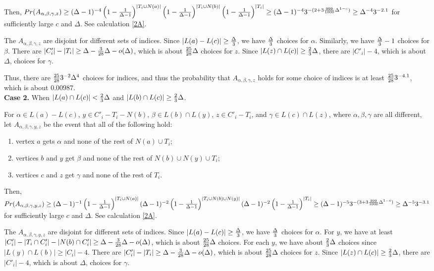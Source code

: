 \documentclass[12pt]{article}
\theoremstyle{definition}
\begin{document}
Then, $Pr(A_{\alpha, \beta, \gamma, z})\geq (\Delta-1)^{-4}\left(1-{1\over \Delta-1}\right)^{|T_i\cup N(a)|}\left(1-{1\over \Delta-1}\right)^{|T_i\cup N(b)|}\left(1-{1\over \Delta-1}\right)^{|T_i|}\geq (\Delta-1)^{-4}3^{-(2+3{999\over 1 000}\Delta^{1-c})}\geq \Delta^{-4} 3^{-2.1}$ for sufficiently large $c$ and $\Delta$. See calculation \ref{2A}.

The $A_{\alpha, \beta, \gamma, z}$ are disjoint for different sets of indices. 
Since $|L(a)-L(c)|\geq {\Delta\over 3}$, we have $\Delta\over 3$ choices for $\alpha$. 
Similarly, we have ${\Delta\over 3}-1$ choices for $\beta$. 
There are $|C'_i|-|T_i|\geq \Delta-{3\over 28}\Delta-o(\Delta)$, which is about ${25\over 28}\Delta$ choices for $z$. Since $|L(z)\cap L(c)|\geq {2\over 3}\Delta$, there are $|C'_i|-4$, which is about $\Delta$, choices for $\gamma$. 

Thus, there are ${25\over 28}3^{-2}\Delta^4$ choices for indices, and thus the probability that $A_{\alpha, \beta, \gamma, z}$ holds for some choice of indices is at least ${25\over 28}3^{-4.1}$, which is about $0.00987$. \\

{\bf Case 2.} When $|L(a)\cap L(c)|<{2\over 3}\Delta$ and $|L(b)\cap L(c)|\geq{2\over 3}\Delta$.

For $\alpha\in L(a)-L(c)$, $y\in C'_i-T_i-N(b)$, $\beta\in L(b)\cap L(y)$, $z\in C'_i-T_i$, and $\gamma\in L(c)\cap L(z)$, where $\alpha, \beta, \gamma$ are all different, let $A_{\alpha, \beta, \gamma, y, z}$ be the event that all of the following hold:

\begin{enumerate}[$(i)$]
\item vertex $a$ gets $\alpha$ and none of the rest of $N(a)\cup T_i$;
\item vertices $b$ and $y$ get $\beta$ and none of the rest of $N(b)\cup N(y) \cup T_i$;
\item vertices $c$ and $z$ get $\gamma$ and none of the rest of $T_i$.
\end{enumerate} 

Then, $Pr(A_{\alpha, \beta, \gamma, y, z})\geq (\Delta-1)^{-1}\left(1-{1\over \Delta-1}\right)^{|T_i\cup N(a)|}(\Delta-1)^{-2}\left(1-{1\over \Delta-1}\right)^{|T_i\cup N(b)\cup N(y)|}(\Delta-1)^{-2}\left(1-{1\over \Delta-1}\right)^{|T_i|}\geq (\Delta-1)^{-5}3^{-(3+3{999\over 1 000}\Delta^{1-c})}\geq \Delta^{-5} 3^{-3.1}$ for sufficiently large $c$ and $\Delta$. See calculation \ref{2A}.

The $A_{\alpha, \beta, \gamma, y, z}$ are disjoint for different sets of indices. 
Since $|L(a)-L(c)|\geq {\Delta\over 3}$, we have $\Delta\over 3$ choices for $\alpha$. 
For $y$, we have at least $|C'_i|-|T_i\cap C'_i|-|N(b)\cap C'_i|\geq \Delta-{3\over 28}\Delta-o(\Delta)$, which is about ${25\over 28}\Delta$ choices. 
For each $y$, we have about ${2\over 3}\Delta$ choices since $|L(y)\cap L(b)|\geq |C_i|-4$. 
There are $|C'_i|-|T_i|\geq \Delta-{3\over 28}\Delta-o(\Delta)$, which is about ${25\over 28}\Delta$ choices for $z$. Since $|L(z)\cap L(c)|\geq {2\over 3}\Delta$, there are $|C'_i|-4$, which is about $\Delta$, choices for $\gamma$. 
\end{document}

